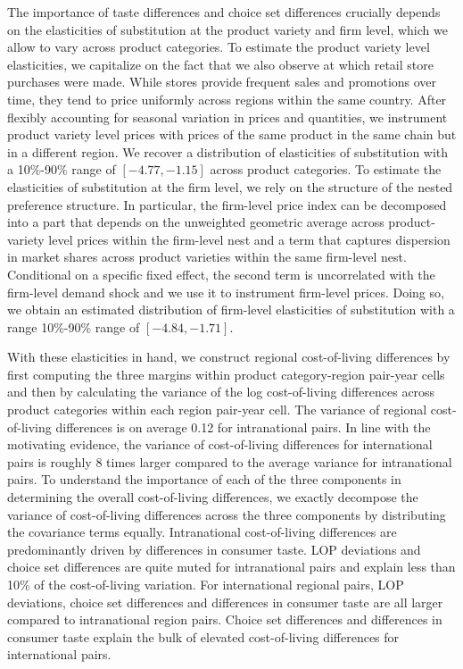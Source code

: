 The importance of taste differences and choice set differences crucially depends on the elasticities of substitution at the product variety and firm level, which we allow to vary across product categories. To estimate the product variety level elasticities, we capitalize on the fact that we also observe at which retail store purchases were made. While stores provide frequent sales and promotions over time, they tend to price uniformly across regions within the same country. After flexibly accounting for seasonal variation in prices and quantities, we instrument product variety level prices with prices of the same product in the same chain but in a different region. We recover a distribution of elasticities of substitution with a 10\%-90\% range of $[-4.77,-1.15]$ across product categories. To estimate the elasticities of substitution at the firm level, we rely on the structure of the nested preference structure. In particular, the firm-level price index can be decomposed into a part that depends on the unweighted geometric average across product-variety level prices within the firm-level nest and a term that captures dispersion in market shares across product varieties within the same firm-level nest. Conditional on a specific fixed effect, the second term is uncorrelated with the firm-level demand shock and we use it to instrument firm-level prices. Doing so, we obtain an estimated distribution of firm-level elasticities of substitution with a range 10\%-90\% range of $[-4.84,-1.71]$.  

With these elasticities in hand, we construct regional cost-of-living differences by first computing the three margins within product category-region pair-year cells and then by calculating the variance of the log cost-of-living differences across product categories within each region pair-year cell. The variance of regional cost-of-living differences is on average 0.12 for intranational pairs. In line with the motivating evidence, the variance of cost-of-living differences for international pairs is roughly 8 times larger compared to the average variance for intranational pairs. To understand the importance of each of the three components in determining the overall cost-of-living differences, we exactly decompose the variance of cost-of-living differences across the three components by distributing the covariance terms equally. Intranational cost-of-living differences are predominantly driven by differences in consumer taste. LOP deviations and choice set differences are quite muted for intranational pairs and explain less than 10\% of the cost-of-living variation. For international regional pairs, LOP deviations, choice set differences and differences in consumer taste are all larger compared to intranational region pairs. Choice set differences and differences in consumer taste explain the bulk of elevated cost-of-living differences for international pairs.


